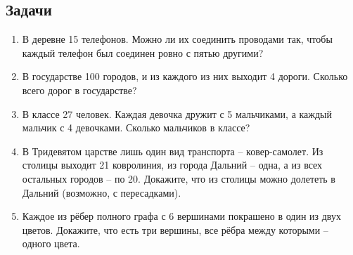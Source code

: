 \documentclass[a4paper,12pt]{article}
\begin{document}
\subsection*{Задачи}
\begin{enumerate}
    \item В деревне 15 телефонов. Можно ли их соединить проводами так, чтобы каждый телефон был соединен ровно с пятью другими? 
    \item В государстве 100 городов, и из каждого из них выходит 4 дороги. Сколько всего дорог в государстве?
    \item В классе 27 человек. Каждая девочка дружит с 5 мальчиками, а каждый мальчик с 4 девочками. Сколько мальчиков в классе?
    \item В Тридевятом царстве лишь один вид транспорта – ковер-самолет. Из столицы выходит 21 ковролиния, из города Дальний – одна, а из всех остальных городов – по 20. Докажите, что из столицы можно долететь в Дальний (возможно, с пересадками).
    \item Каждое из рёбер полного графа с 6 вершинами покрашено в один из двух цветов.
Докажите, что есть три вершины, все рёбра между которыми – одного цвета.
\end{enumerate}
\end{document}
